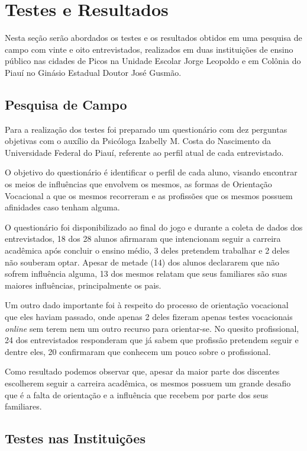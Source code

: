 \documentclass[
	12pt,				%
    oneside,			%
	a4paper,			%
	english,			%
	french,				%
	spanish,			%
	brazil,				%
	]{abntex2}
\begin{document}
\chapter{Testes e Resultados}

Nesta seção serão abordados os testes e os resultados obtidos em uma pesquisa de campo com vinte e oito entrevistados, realizados em duas instituições de ensino público nas cidades de Picos na Unidade Escolar Jorge Leopoldo e em Colônia do Piauí no Ginásio Estadual Doutor José Gusmão.  

\section{Pesquisa de Campo}

Para a realização dos testes foi preparado um questionário com dez perguntas objetivas com o auxílio da Psicóloga Izabelly M. Costa do Nascimento da Universidade Federal do Piauí, referente ao perfil atual de cada entrevistado.

O objetivo do questionário é identificar o perfil de cada aluno, visando encontrar os meios de influências que envolvem os mesmos, as formas de Orientação Vocacional a que os mesmos recorreram e as profissões que os mesmos possuem afinidades caso tenham alguma.

O questionário foi disponibilizado ao final do jogo e durante a coleta de dados dos entrevistados, 18 dos 28 alunos afirmaram que intencionam seguir a carreira acadêmica após concluir o ensino médio, 3 deles pretendem trabalhar e 2 deles não souberam optar. Apesar de metade (14) dos alunos declararem que não sofrem influência alguma, 13 dos mesmos relatam que seus familiares são suas maiores influências, principalmente os pais.

Um outro dado importante foi à respeito do processo de orientação vocacional que eles haviam passado, onde apenas 2 deles fizeram apenas testes vocacionais \textit{online} sem terem nem um outro recurso para orientar-se.
No quesito profissional, 24 dos entrevistados responderam que já sabem que profissão pretendem seguir e dentre eles, 20 confirmaram que conhecem um pouco sobre o profissional.

Como resultado podemos observar que, apesar da maior parte dos discentes escolherem seguir a carreira acadêmica, os mesmos possuem um grande desafio que é a falta de orientação e a influência que recebem por parte dos seus familiares.

\section{Testes nas Instituições}
\end{document}
